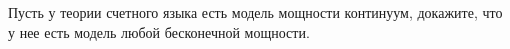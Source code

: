 Пусть у теории счетного языка есть модель мощности континуум, докажите, что у нее есть модель любой
бесконечной мощности.

